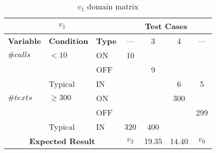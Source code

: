 %
  {\protect\numberline{}}
\begin{table}[!htbp]
  \centering
  \begin{tabular}{|*{3}{l|}*{4}{c|}}
    \hline
    \multicolumn{3}{|c|}{$v_1$}
    & \multicolumn{4}{|c|}{\textbf{Test Cases}} \\ \hline
    \textbf{Variable} & \textbf{Condition} & \textbf{Type}
                                &  ---  &   3    &   4   &  ---  \\ \hline
    $\#calls$ &  $< 10$   & ON  &  10   &        &       &       \\ \cline{3-7}
              &           & OFF &       &   9    &       &       \\ \cline{2-7}
              &  Typical  & IN  &       &        &   6   &   5   \\ \hline
    $\#texts$ & $\ge 300$ & ON  &       &        &  300  &       \\ \cline{3-7}
              &           & OFF &       &        &       &  299  \\ \cline{2-7}
              &  Typical  & IN  &  320  &  400   &       &       \\ \hline
    \multicolumn{3}{|c|}{\textbf{Expected Result}}
                                & $v_3$ & 19.35  & 14.40 & $v_0$ \\ \hline
  \end{tabular}
  \caption{$v_1$ domain matrix}
  \label{tab:methods.computeBill.matrices.v1}
\end{table}

